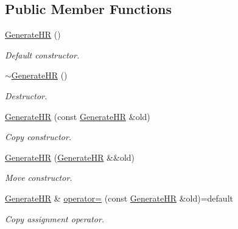 \subsection*{Public Member Functions}
\begin{DoxyCompactItemize}
\item 
\mbox{\label{classsamp_files_1_1_generate_h_r_a2b8e7405afb964ecfbb9c005b8afbf5f}} 
\hyperlink{classsamp_files_1_1_generate_h_r_a2b8e7405afb964ecfbb9c005b8afbf5f}{Generate\+HR} ()
\begin{DoxyCompactList}\small\item\em Default constructor. \end{DoxyCompactList}\item 
\mbox{\label{classsamp_files_1_1_generate_h_r_ad275775b4118f5147d200aed1d5cc48f}} 
\hyperlink{classsamp_files_1_1_generate_h_r_ad275775b4118f5147d200aed1d5cc48f}{$\sim$\+Generate\+HR} ()
\begin{DoxyCompactList}\small\item\em Destructor. \end{DoxyCompactList}\item 
\hyperlink{classsamp_files_1_1_generate_h_r_aae078758c8b83665628601feb63d956a}{Generate\+HR} (const \hyperlink{classsamp_files_1_1_generate_h_r}{Generate\+HR} \&old)
\begin{DoxyCompactList}\small\item\em Copy constructor. \end{DoxyCompactList}\item 
\hyperlink{classsamp_files_1_1_generate_h_r_adcda1d80769593770720f503e2be87ae}{Generate\+HR} (\hyperlink{classsamp_files_1_1_generate_h_r}{Generate\+HR} \&\&old)
\begin{DoxyCompactList}\small\item\em Move constructor. \end{DoxyCompactList}\item 
\hyperlink{classsamp_files_1_1_generate_h_r}{Generate\+HR} \& \hyperlink{classsamp_files_1_1_generate_h_r_a53cdc064c4d6ba7f1189948376f8b071}{operator=} (const \hyperlink{classsamp_files_1_1_generate_h_r}{Generate\+HR} \&old)=default
\begin{DoxyCompactList}\small\item\em Copy assignment operator. \end{DoxyCompactList}\item 

\end{DoxyCompactItemize}
